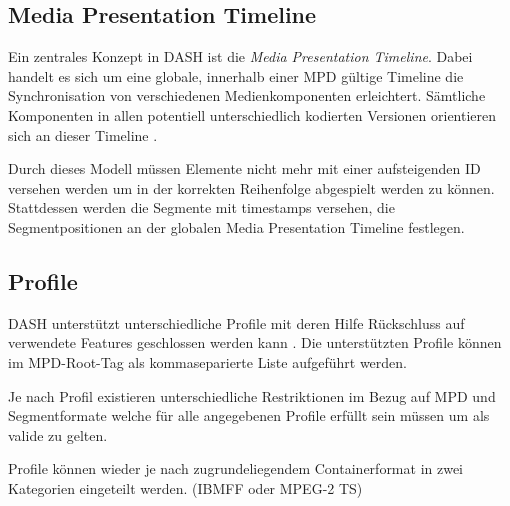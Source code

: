 \documentclass[paper = a4, fontsize = 12pt, parskip = half]{scrartcl} %
\begin{document}
\subsection{Media Presentation Timeline}
Ein zentrales Konzept in DASH ist die \textit{Media Presentation Timeline}. Dabei handelt es sich um eine globale, innerhalb einer MPD gültige Timeline die Synchronisation von verschiedenen Medienkomponenten erleichtert. Sämtliche Komponenten in allen potentiell unterschiedlich kodierten Versionen orientieren sich an dieser Timeline \cite{international_organization_for_standardization_isoiec_nodate}.

Durch dieses Modell müssen Elemente nicht mehr mit einer aufsteigenden ID versehen werden um in der korrekten Reihenfolge abgespielt werden zu können. Stattdessen werden die Segmente mit timestamps versehen, die Segmentpositionen an der globalen Media Presentation Timeline festlegen.

\subsection{Profile}
\label{profiles}
DASH unterstützt unterschiedliche Profile mit deren Hilfe Rückschluss auf verwendete Features geschlossen werden kann \cite{international_organization_for_standardization_isoiec_nodate}. Die unterstützten Profile können im MPD-Root-Tag als kommaseparierte Liste aufgeführt werden.

Je nach Profil existieren unterschiedliche Restriktionen im Bezug auf MPD und Segmentformate welche für alle angegebenen Profile erfüllt sein müssen um als valide zu gelten.

Profile können wieder je nach zugrundeliegendem Containerformat in zwei Kategorien eingeteilt werden. (IBMFF oder MPEG-2 TS)
\end{document}
